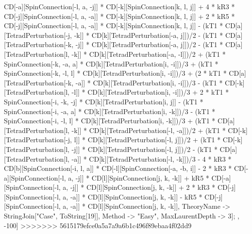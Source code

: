 CD[-a][SpinConnection[-l, a, -j]] * CD[-k][SpinConnection[k, l, j]] + 4 * kR3 * CD[-j][SpinConnection[-l, a, -a]] * CD[-k][SpinConnection[k, l, j]] + 2 * kR5 * CD[-j][SpinConnection[-l, a, -a]] * CD[-k][SpinConnection[k, l, j]] - (kT1 * CD[a][TetradPerturbation[-j, -k]] * CD[k][TetradPerturbation[-a, j]])/2 - (kT1 * CD[a][TetradPerturbation[-k, -j]] * CD[k][TetradPerturbation[-a, j]])/2 - (kT1 * CD[a][TetradPerturbation[l, -k]] * CD[k][TetradPerturbation[-a, -l]])/2 + (kT1 * SpinConnection[-k, -a, a] * CD[k][TetradPerturbation[i, -i]])/3 + (kT1 * SpinConnection[-k, -l, l] * CD[k][TetradPerturbation[i, -i]])/3 + (2 * kT1 * CD[a][TetradPerturbation[-k, -a]] * CD[k][TetradPerturbation[i, -i]])/3 - (kT1 * CD[-k][TetradPerturbation[l, -l]] * CD[k][TetradPerturbation[i, -i]])/3 + 2 * kT1 * SpinConnection[-i, -k, -j] * CD[k][TetradPerturbation[i, j]] - (kT1 * SpinConnection[-i, -a, a] * CD[k][TetradPerturbation[i, -k]])/3 - (kT1 * SpinConnection[-i, -l, l] * CD[k][TetradPerturbation[i, -k]])/3 + (kT1 * CD[a][TetradPerturbation[l, -k]] * CD[k][TetradPerturbation[-l, -a]])/2 + (kT1 * CD[-k][TetradPerturbation[-j, l]] * CD[k][TetradPerturbation[-l, j]])/2 + (kT1 * CD[-k][TetradPerturbation[l, -j]] * CD[k][TetradPerturbation[-l, j]])/2 - (kT1 * CD[a][TetradPerturbation[l, -a]] * CD[k][TetradPerturbation[-l, -k]])/3 - 4 * kR3 * CD[b][SpinConnection[-i, l, a]] * CD[-l][SpinConnection[-a, -b, i]] - 2 * kR3 * CD[-a][SpinConnection[-l, a, -j]] * CD[l][SpinConnection[j, k, -k]] + kR5 * CD[-a][SpinConnection[-l, a, -j]] * CD[l][SpinConnection[j, k, -k]] + 2 * kR3 * CD[-j][SpinConnection[-l, a, -a]] * CD[l][SpinConnection[j, k, -k]] - kR5 * CD[-j][SpinConnection[-l, a, -a]] * CD[l][SpinConnection[j, k, -k]], TheoryName -> StringJoin["Case", ToString[19]], Method -> "Easy", MaxLaurentDepth -> 3]; , -100]
>>>>>>> 5615179efce0a5a7a9a6b1c496f89ebaa4f02dd9
